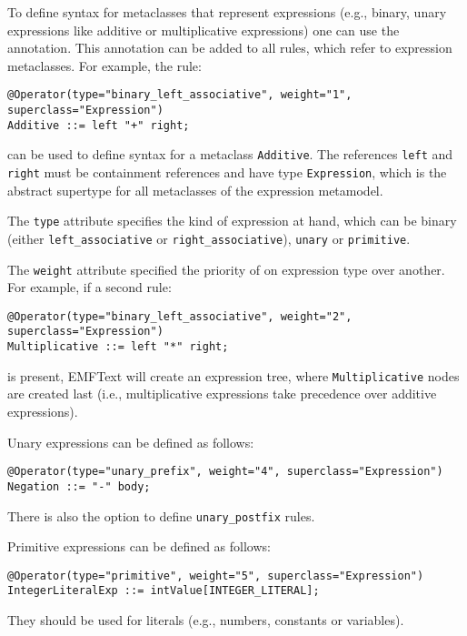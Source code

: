To define syntax for metaclasses that represent expressions (e.g., binary, unary
expressions like additive or multiplicative expressions) one can use the
\texttt{\@Operator} annotation. This annotation can be added to all rules, which
refer to expression metaclasses. For example, the rule:

\begin{lstlisting}
@Operator(type="binary_left_associative", weight="1", superclass="Expression")
Additive ::= left "+" right;
\end{lstlisting}

can be used to define syntax for a metaclass \texttt{Additive}. The references
\texttt{left} and \texttt{right} must be containment references and have type
\texttt{Expression}, which is the abstract supertype for all metaclasses of the 
expression metamodel.

The \texttt{type} attribute specifies the kind of expression at hand, which can
be binary (either \texttt{left\_associative} or \texttt{right\_associative}),
\texttt{unary} or \texttt{primitive}.

The \texttt{weight} attribute specified the priority of on expression type over
another. For example, if a second rule:

\begin{lstlisting}
@Operator(type="binary_left_associative", weight="2", superclass="Expression")
Multiplicative ::= left "*" right;
\end{lstlisting}

is present, EMFText will create an expression tree, where
\texttt{Multiplicative} nodes are created last (i.e., multiplicative expressions 
take precedence over additive expressions).

Unary expressions can be defined as follows:

\begin{lstlisting}
@Operator(type="unary_prefix", weight="4", superclass="Expression")	
Negation ::= "-" body;
\end{lstlisting}

There is also the option to define \texttt{unary\_postfix} rules.

Primitive expressions can be defined as follows:

\begin{lstlisting}
@Operator(type="primitive", weight="5", superclass="Expression")
IntegerLiteralExp ::= intValue[INTEGER_LITERAL];
\end{lstlisting}

They should be used for literals (e.g., numbers, constants or variables).

